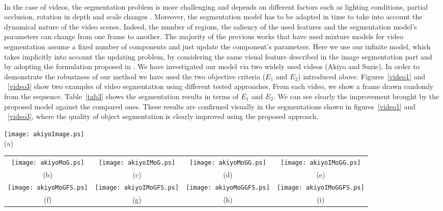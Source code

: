 \documentclass[journal,10pt]{elsart}
\begin{document}
\\
In the case of videos, the segmentation problem is more challenging and depends on different factors such as lighting conditions, partial occlusion, rotation in depth and scale changes \cite{Raja1998}. Moreover, the segmentation model has to be adapted in time to take into account the dynamical nature of the video scenes. Indeed, the number of regions, the saliency of the used features and the segmentation model's parameters can change from one frame to another. The majority of the previous works that have used mixture models for video segmentation assume a fixed number of components and just update the component's parameters. Here we use our infinite model, which takes implicitly into account the updating problem, by considering the same visual feature described in the image segmentation part and by adopting the formulation proposed in \cite{Allili2010}. We have investigated our model via two widely used videos (Akiyo and Suzie). In order to demonstrate the robustness of our method we have used the two objective criteria ($E_1$ and $E_2$) introduced above. Figures~\ref{video1} and ~\ref{video3} show two examples of video segmentation using different tested approaches. From each video, we show a frame drawn randomly from the sequence. Table~\ref{tab3} shows the segmentation results in terms of $E_1$ and $E_2$. We can see clearly the improvement brought by the proposed model against the compared ones. These results are confirmed visually in the segmentations shown in figures~\ref{video1} and ~\ref{video3}, where the quality of object segmentation is clearly improved using the proposed approach.
\begin{figure*}
\begin{center}
\texttt{[image: akiyoImage.ps]}\\
(a)
\end{center}
\begin{center}
\begin{tabular}{cccc}
 \texttt{[image: akiyoMoG.ps]}
&
\texttt{[image: akiyoIMoG.ps]}
&
\texttt{[image: akiyoMoGG.ps]}
&
\texttt{[image: akiyoIMoGG.ps]}
\\
(b)&(c)&(d)&(e)
\\
 \texttt{[image: akiyoMoGFS.ps]}
&
\texttt{[image: akiyoIMoGFS.ps]}
&
\texttt{[image: akiyoMoGGFS.ps]}
&
\texttt{[image: akiyoIMoGGFS.ps]}
\\
(f)&(g)&(h)&(i)
\end{tabular}
\caption{Sample image from Akiyo video. (a) Sample frame, (b) GM, (c) IGM, (d) GGM, (e) IGGM, (f) GM+FS, (g) IGM+FS, (h) GGM+FS, (i) IGGM+FS.} \label{video1}
\end{center}
\end{figure*}
\end{document}
